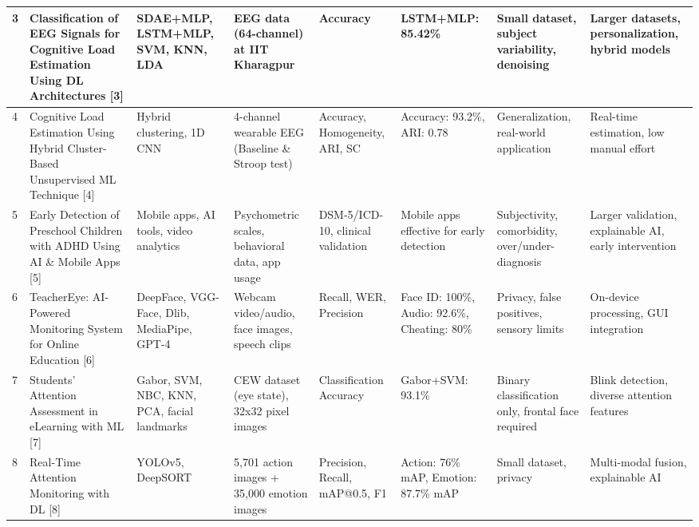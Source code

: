 \documentclass[twocolumn,12pt]{article}
\newcommand{\tablecell}[1]{\raggedright\footnotesize #1}
\begin{document}
{\begin{longtable}{|p{}|p{}|p{}|p{}|p{}|p{}|p{}|p{}|}
\hline
3 & \tablecell{Classification of EEG Signals for Cognitive Load Estimation Using DL Architectures [3]} & \tablecell{SDAE+MLP, LSTM+MLP, SVM, KNN, LDA} & \tablecell{EEG data (64-channel) at IIT Kharagpur} & \tablecell{Accuracy} & \tablecell{LSTM+MLP: 85.42\%} & \tablecell{Small dataset, subject variability, denoising} & \tablecell{Larger datasets, personalization, hybrid models} \\
\hline
4 & \tablecell{Cognitive Load Estimation Using Hybrid Cluster-Based Unsupervised ML Technique [4]} & \tablecell{Hybrid clustering, 1D CNN} & \tablecell{4-channel wearable EEG (Baseline \& Stroop test)} & \tablecell{Accuracy, Homogeneity, ARI, SC} & \tablecell{Accuracy: 93.2\%, ARI: 0.78} & \tablecell{Generalization, real-world application} & \tablecell{Real-time estimation, low manual effort} \\
\hline
5 & \tablecell{Early Detection of Preschool Children with ADHD Using AI \& Mobile Apps [5]} & \tablecell{Mobile apps, AI tools, video analytics} & \tablecell{Psychometric scales, behavioral data, app usage} & \tablecell{DSM-5/ICD-10, clinical validation} & \tablecell{Mobile apps effective for early detection} & \tablecell{Subjectivity, comorbidity, over/under-diagnosis} & \tablecell{Larger validation, explainable AI, early intervention} \\
\hline
6 & \tablecell{TeacherEye: AI-Powered Monitoring System for Online Education [6]} & \tablecell{DeepFace, VGG-Face, Dlib, MediaPipe, GPT-4} & \tablecell{Webcam video/audio, face images, speech clips} & \tablecell{Recall, WER, Precision} & \tablecell{Face ID: 100\%, Audio: 92.6\%, Cheating: 80\%} & \tablecell{Privacy, false positives, sensory limits} & \tablecell{On-device processing, GUI integration} \\
\hline
7 & \tablecell{Students’ Attention Assessment in eLearning with ML [7]} & \tablecell{Gabor, SVM, NBC, KNN, PCA, facial landmarks} & \tablecell{CEW dataset (eye state), 32x32 pixel images} & \tablecell{Classification Accuracy} & \tablecell{Gabor+SVM: 93.1\%} & \tablecell{Binary classification only, frontal face required} & \tablecell{Blink detection, diverse attention features} \\
\hline
8 & \tablecell{Real-Time Attention Monitoring with DL [8]} & \tablecell{YOLOv5, DeepSORT} & \tablecell{5,701 action images + 35,000 emotion images} & \tablecell{Precision, Recall, mAP@0.5, F1} & \tablecell{Action: 76\% mAP, Emotion: 87.7\% mAP} & \tablecell{Small dataset, privacy} & \tablecell{Multi-modal fusion, explainable AI} \\

\end{longtable}}
\end{document}
